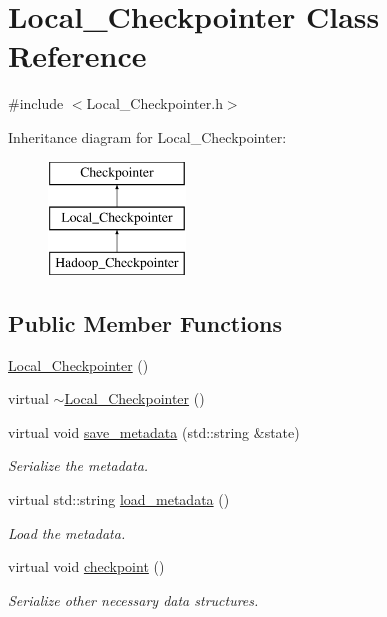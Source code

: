 \hypertarget{class_local___checkpointer}{
\section{Local\_\-Checkpointer Class Reference}
\label{class_local___checkpointer}
}


{\ttfamily \#include $<$Local\_\-Checkpointer.h$>$}

Inheritance diagram for Local\_\-Checkpointer:\begin{figure}[H]
\begin{center}
\leavevmode
\includegraphics[height=3cm]{class_local___checkpointer}
\end{center}
\end{figure}
\subsection*{Public Member Functions}
\begin{DoxyCompactItemize}
\item 
\hyperlink{class_local___checkpointer_aade758e515038c5c20b3ea4cb64e0732}{Local\_\-Checkpointer} ()
\item 
virtual \hyperlink{class_local___checkpointer_a62ad6f9cfea93826687e138f98182e2f}{$\sim$Local\_\-Checkpointer} ()
\item 
virtual void \hyperlink{class_local___checkpointer_a9539be451ec14462873da2658e3ead80}{save\_\-metadata} (std::string \&state)
\begin{DoxyCompactList}\small\item\em Serialize the metadata. \item\end{DoxyCompactList}\item 
virtual std::string \hyperlink{class_local___checkpointer_a3a2bdc4e2afa1434605c69c3f46db69f}{load\_\-metadata} ()
\begin{DoxyCompactList}\small\item\em Load the metadata. \item\end{DoxyCompactList}\item 
virtual void \hyperlink{class_local___checkpointer_aa271d3a80545d6a962c959c82fa7b7c7}{checkpoint} ()
\begin{DoxyCompactList}\small\item\em Serialize other necessary data structures. \item\end{DoxyCompactList}\end{DoxyCompactItemize}


